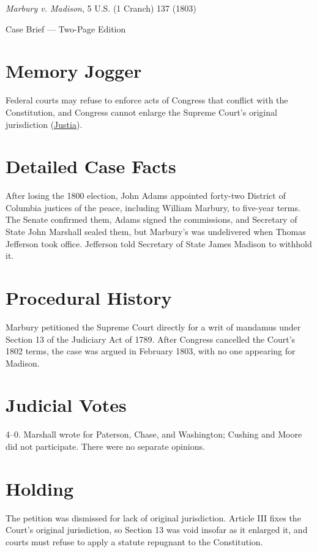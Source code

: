 \documentclass[12pt]{article}
\begin{document}
\begin{center}
{\LARGE \textit{Marbury v. Madison}, 5 U.S. (1 Cranch) 137 (1803)\par}
\vspace{0.5em}
{\large Case Brief --- Two-Page Edition\par}
\end{center}

\section{Memory Jogger}
Federal courts may refuse to enforce acts of Congress that conflict with the Constitution, and Congress cannot enlarge the Supreme Court's original jurisdiction (\href{https://supreme.justia.com/cases/federal/us/5/137/}{Justia}).

\section{Detailed Case Facts}
After losing the 1800 election, John Adams appointed forty-two District of Columbia justices of the peace, including William Marbury, to five-year terms. The Senate confirmed them, Adams signed the commissions, and Secretary of State John Marshall sealed them, but Marbury's was undelivered when Thomas Jefferson took office. Jefferson told Secretary of State James Madison to withhold it.

\section{Procedural History}
Marbury petitioned the Supreme Court directly for a writ of mandamus under Section 13 of the Judiciary Act of 1789. After Congress cancelled the Court's 1802 terms, the case was argued in February 1803, with no one appearing for Madison.

\section{Judicial Votes}
4--0. Marshall wrote for Paterson, Chase, and Washington; Cushing and Moore did not participate. There were no separate opinions.

\section{Holding}
The petition was dismissed for lack of original jurisdiction. Article III fixes the Court's original jurisdiction, so Section 13 was void insofar as it enlarged it, and courts must refuse to apply a statute repugnant to the Constitution.
\end{document}
